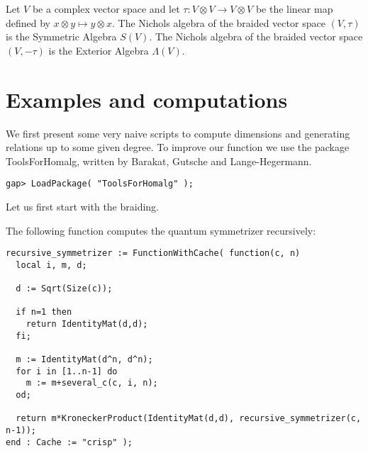 \documentclass[graybox]{svmult}
\begin{document}
\begin{example}
	Let $V$ be a complex vector space and let $\tau:V\otimes V\to V\otimes V$
	be the linear map defined by $x\otimes y\mapsto y\otimes x$. The Nichols
	algebra of the braided vector space $(V,\tau)$ is the Symmetric Algebra
	$S(V)$. The Nichols algebra of the braided vector space $(V,-\tau)$ is the
	Exterior Algebra $\Lambda(V)$.
\end{example}

\section{Examples and computations}

We first present some very naive scripts to compute dimensions and generating
relations up to some given degree. To improve our function we use the package
ToolsForHomalg, written by Barakat, Gutsche and Lange-Hegermann.

\begin{lstlisting}
gap> LoadPackage( "ToolsForHomalg" );
\end{lstlisting}

Let us first start with the braiding. 

The following function computes the quantum symmetrizer recursively:
\begin{lstlisting}
recursive_symmetrizer := FunctionWithCache( function(c, n)
  local i, m, d;

  d := Sqrt(Size(c));

  if n=1 then
    return IdentityMat(d,d);
  fi;

  m := IdentityMat(d^n, d^n);
  for i in [1..n-1] do
    m := m+several_c(c, i, n);
  od;

  return m*KroneckerProduct(IdentityMat(d,d), recursive_symmetrizer(c,
n-1));
end : Cache := "crisp" );
\end{lstlisting}
\end{document}
